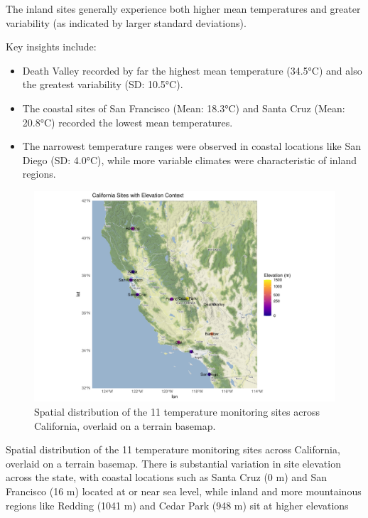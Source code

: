 \documentclass[
  11pt,
]{article}
\begin{document}
The inland sites generally experience both higher mean temperatures and
greater variability (as indicated by larger standard deviations).

Key insights include:

\begin{itemize}
\item
  Death Valley recorded by far the highest mean temperature (34.5°C) and
  also the greatest variability (SD: 10.5°C).
\item
  The coastal sites of San Francisco (Mean: 18.3°C) and Santa Cruz
  (Mean: 20.8°C) recorded the lowest mean temperatures.
\item
  The narrowest temperature ranges were observed in coastal locations
  like San Diego (SD: 4.0°C), while more variable climates were
  characteristic of inland regions.
\end{itemize}

\begin{figure}[H]

{\centering \includegraphics{project_files/figure-pdf/ca_map_elevation-1.pdf}

}

\caption{Spatial distribution of the 11 temperature monitoring sites
across California, overlaid on a terrain basemap.}

\end{figure}%

Spatial distribution of the 11 temperature monitoring sites across
California, overlaid on a terrain basemap. There is substantial
variation in site elevation across the state, with coastal locations
such as Santa Cruz (0 m) and San Francisco (16 m) located at or near sea
level, while inland and more mountainous regions like Redding (1041 m)
and Cedar Park (948 m) sit at higher elevations
\end{document}
